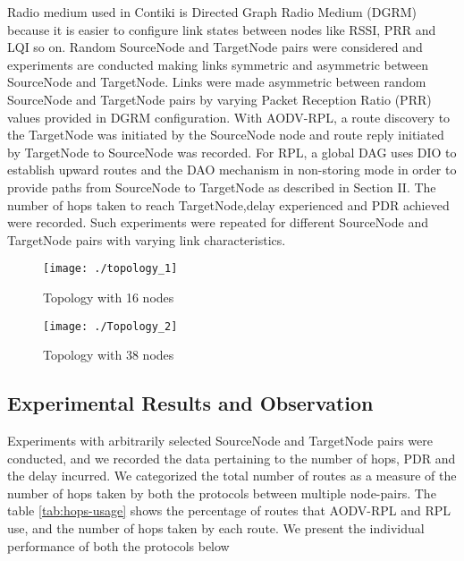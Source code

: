 \documentclass[conference, letterpaper]{IEEEtran}
\begin{document}
Radio medium used in Contiki is Directed Graph Radio Medium (DGRM) because it
is easier to configure link states between nodes like RSSI, PRR and LQI so on.
Random SourceNode and TargetNode pairs were considered and experiments are
conducted  making  links symmetric and asymmetric between SourceNode and
TargetNode. Links were	made asymmetric between random SourceNode and
TargetNode pairs by varying Packet Reception Ratio (PRR) values provided in
DGRM configuration. With AODV-RPL, a route discovery to the TargetNode was
initiated by the  SourceNode node and route reply initiated by TargetNode to
SourceNode was recorded. For RPL, a global DAG uses DIO to establish upward
routes and the DAO mechanism in non-storing mode in order to provide paths from
SourceNode to TargetNode as described in Section II. The number of hops taken
to reach TargetNode,delay experienced and PDR achieved were recorded.  Such
experiments were repeated for different  SourceNode and TargetNode pairs with
varying link characteristics.

\begin{figure}[h!]
\texttt{[image: ./topology\_1]}
\caption{Topology with 16 nodes}
\label{fig:topology_1}
\end{figure}
\begin{figure}[h!]
\texttt{[image: ./Topology\_2]}
\caption{Topology with 38 nodes}
\label{fig:Topology_2}
\end{figure}

\subsection{Experimental Results and Observation}

Experiments with arbitrarily selected SourceNode and TargetNode pairs were
conducted, and we recorded the data pertaining to the number of hops, PDR and
the delay incurred. We categorized the total number of routes as a measure of
the number of hops taken by both the protocols between multiple node-pairs. The
table \ref{tab:hops-usage} shows the percentage of routes that AODV-RPL and RPL
use, and the number of hops taken by each route. We present the individual
performance of both the protocols below

\end{document}

